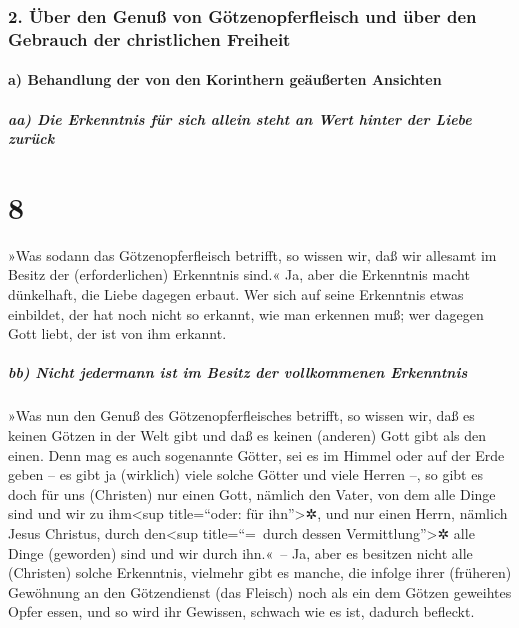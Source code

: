 \hypertarget{uxfcber-den-genuuxdf-von-guxf6tzenopferfleisch-und-uxfcber-den-gebrauch-der-christlichen-freiheit}{%
\subsubsection{2. Über den Genuß von Götzenopferfleisch und über den
Gebrauch der christlichen
Freiheit}\label{uxfcber-den-genuuxdf-von-guxf6tzenopferfleisch-und-uxfcber-den-gebrauch-der-christlichen-freiheit}}

\hypertarget{a-behandlung-der-von-den-korinthern-geuxe4uuxdferten-ansichten}{%
\paragraph{a) Behandlung der von den Korinthern geäußerten
Ansichten}\label{a-behandlung-der-von-den-korinthern-geuxe4uuxdferten-ansichten}}

\hypertarget{aa-die-erkenntnis-fuxfcr-sich-allein-steht-an-wert-hinter-der-liebe-zuruxfcck}{%
\subparagraph{aa) Die Erkenntnis für sich allein steht an Wert hinter
der Liebe
zurück}\label{aa-die-erkenntnis-fuxfcr-sich-allein-steht-an-wert-hinter-der-liebe-zuruxfcck}}

\hypertarget{section-7}{%
\section{8}\label{section-7}}

 »Was sodann das Götzenopferfleisch betrifft, so wissen
wir, daß wir allesamt im Besitz der (erforderlichen) Erkenntnis sind.«
Ja, aber die Erkenntnis macht dünkelhaft, die Liebe dagegen erbaut.
 Wer sich auf seine Erkenntnis etwas einbildet, der hat
noch nicht so erkannt, wie man erkennen muß;  wer dagegen
Gott liebt, der ist von ihm erkannt.

\hypertarget{bb-nicht-jedermann-ist-im-besitz-der-vollkommenen-erkenntnis}{%
\subparagraph{bb) Nicht jedermann ist im Besitz der vollkommenen
Erkenntnis}\label{bb-nicht-jedermann-ist-im-besitz-der-vollkommenen-erkenntnis}}

 »Was nun den Genuß des Götzenopferfleisches betrifft, so
wissen wir, daß es keinen Götzen in der Welt gibt und daß es keinen
(anderen) Gott gibt als den einen.  Denn mag es auch
sogenannte Götter, sei es im Himmel oder auf der Erde geben -- es gibt
ja (wirklich) viele solche Götter und viele Herren --,  so
gibt es doch für uns (Christen) nur einen Gott, nämlich den Vater, von
dem alle Dinge sind und wir zu ihm\textless sup title=``oder: für
ihn''\textgreater✲, und nur einen Herrn, nämlich Jesus Christus, durch
den\textless sup title=``=~durch dessen Vermittlung''\textgreater✲ alle
Dinge (geworden) sind und wir durch ihn.«~--  Ja, aber es
besitzen nicht alle (Christen) solche Erkenntnis, vielmehr gibt es
manche, die infolge ihrer (früheren) Gewöhnung an den Götzendienst (das
Fleisch) noch als ein dem Götzen geweihtes Opfer essen, und so wird ihr
Gewissen, schwach wie es ist, dadurch befleckt.

